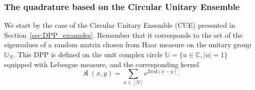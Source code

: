 \documentclass[twoside,11pt]{book}
\newtheorem{theorem}{Theorem}
\numberwithin{theorem}{chapter}
\numberwithin{definition}{chapter}
\numberwithin{proposition}{chapter}
\numberwithin{corollary}{chapter}
\numberwithin{example}{chapter}
\numberwithin{lemma}{chapter}
\numberwithin{assumption}{chapter}
\numberwithin{equation}{chapter}
\numberwithin{figure}{chapter}
\DeclareMathOperator*{\KDPP}{\mathfrak{K}}
\begin{document}
\subsubsection{The quadrature based on the Circular Unitary Ensemble}
We start by the case of the Circular Unitary Ensemble (CUE) presented in Section~\ref{sec:DPP_examples}. Remember that it corresponds to the set of the eigenvalues of a random matrix chosen from Haar measure on the unitary group $\mathbb{U}_{N}$. This DPP is defined on the unit complex circle $\mathbb{U} = \{ u \in \mathbb{C}, |u| =1 \}$ equipped with Lebesgue measure, and the corresponding kernel
\begin{equation}
\KDPP(x,y) = \sum\limits_{n \in [N]} e^{2 \pi n \mathbf{i}(x-y)}.
\end{equation}  






\end{document}
